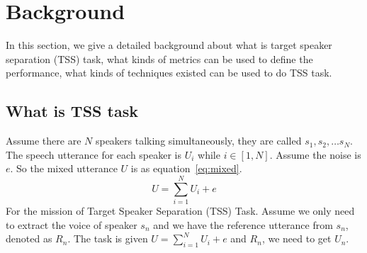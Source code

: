 

\section{Background}\label{sec:background}

In this section, we give a detailed background about what is target speaker separation (TSS) task, what kinds of metrics can be used to define the performance, what kinds of techniques existed can be used to do TSS task.

\subsection{What is TSS task}\label{subsec:what-is-tss-task}

Assume there are $N$ speakers talking simultaneously, they are called $s_1, s_2, \dots s_N$. The speech utterance for each speaker is $U_i$ while $i\in\left[ 1, N \right]$. Assume the noise is $e$.
So the mixed utterance $U$ is as equation~\ref{eq:mixed}.
\begin{equation}
    U = \sum\limits_{i=1}^N U_i + e\label{eq:mixed}
\end{equation}
For the mission of Target Speaker Separation (TSS) Task. Assume we only need to extract the voice of speaker $s_n$ and we have the reference utterance from $s_n$, denoted as $R_n$.
The task is given $U = \sum\limits_{i=1}^N U_i + e$ and $R_n$, we need to get $U_n$.
